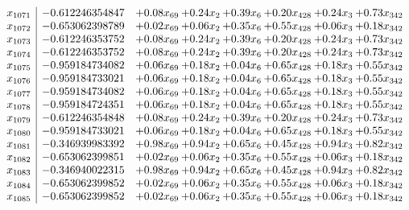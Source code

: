 \documentclass[8pt]{article}
\begin{document}
\[\begin{array}{c| c c@{\hskip 2pt} c@{\hskip 2pt} c@{\hskip 2pt} c@{\hskip 2pt} c@{\hskip 2pt} c@{\hskip 2pt} }
 x_{1071}   &  -0.612246354847 & +  0.08 x_{69} & +  0.24 x_{2} & +  0.39 x_{6} & +  0.20 x_{428} & +  0.24 x_{3} & +  0.73 x_{342}\\
 x_{1072}   &  -0.653062398789 & +  0.02 x_{69} & +  0.06 x_{2} & +  0.35 x_{6} & +  0.55 x_{428} & +  0.06 x_{3} & +  0.18 x_{342}\\
 x_{1073}   &  -0.612246353752 & +  0.08 x_{69} & +  0.24 x_{2} & +  0.39 x_{6} & +  0.20 x_{428} & +  0.24 x_{3} & +  0.73 x_{342}\\
 x_{1074}   &  -0.612246353752 & +  0.08 x_{69} & +  0.24 x_{2} & +  0.39 x_{6} & +  0.20 x_{428} & +  0.24 x_{3} & +  0.73 x_{342}\\
 x_{1075}   &  -0.959184734082 & +  0.06 x_{69} & +  0.18 x_{2} & +  0.04 x_{6} & +  0.65 x_{428} & +  0.18 x_{3} & +  0.55 x_{342}\\
 x_{1076}   &  -0.959184733021 & +  0.06 x_{69} & +  0.18 x_{2} & +  0.04 x_{6} & +  0.65 x_{428} & +  0.18 x_{3} & +  0.55 x_{342}\\
 x_{1077}   &  -0.959184734082 & +  0.06 x_{69} & +  0.18 x_{2} & +  0.04 x_{6} & +  0.65 x_{428} & +  0.18 x_{3} & +  0.55 x_{342}\\
 x_{1078}   &  -0.959184724351 & +  0.06 x_{69} & +  0.18 x_{2} & +  0.04 x_{6} & +  0.65 x_{428} & +  0.18 x_{3} & +  0.55 x_{342}\\
 x_{1079}   &  -0.612246354848 & +  0.08 x_{69} & +  0.24 x_{2} & +  0.39 x_{6} & +  0.20 x_{428} & +  0.24 x_{3} & +  0.73 x_{342}\\
 x_{1080}   &  -0.959184733021 & +  0.06 x_{69} & +  0.18 x_{2} & +  0.04 x_{6} & +  0.65 x_{428} & +  0.18 x_{3} & +  0.55 x_{342}\\
 x_{1081}   &  -0.346939983392 & +  0.98 x_{69} & +  0.94 x_{2} & +  0.65 x_{6} & +  0.45 x_{428} & +  0.94 x_{3} & +  0.82 x_{342}\\
 x_{1082}   &  -0.653062399851 & +  0.02 x_{69} & +  0.06 x_{2} & +  0.35 x_{6} & +  0.55 x_{428} & +  0.06 x_{3} & +  0.18 x_{342}\\
 x_{1083}   &  -0.346940022315 & +  0.98 x_{69} & +  0.94 x_{2} & +  0.65 x_{6} & +  0.45 x_{428} & +  0.94 x_{3} & +  0.82 x_{342}\\
 x_{1084}   &  -0.653062399852 & +  0.02 x_{69} & +  0.06 x_{2} & +  0.35 x_{6} & +  0.55 x_{428} & +  0.06 x_{3} & +  0.18 x_{342}\\
 x_{1085}   &  -0.653062399852 & +  0.02 x_{69} & +  0.06 x_{2} & +  0.35 x_{6} & +  0.55 x_{428} & +  0.06 x_{3} & +  0.18 x_{342}\\

\end{array}\]
\end{document}
